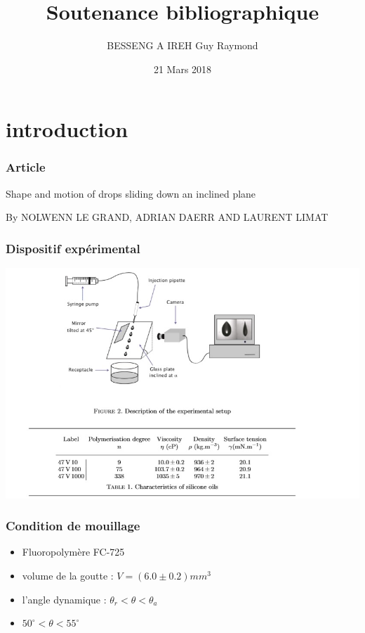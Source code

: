 \documentclass{beamer}
\title{Soutenance bibliographique}
\author{BESSENG A IREH Guy Raymond}
\institute[]{Université Paul Sabatier}
\date{21 Mars 2018}
\begin{document}
\maketitle
\section{introduction}
\begin{frame}
\frametitle{Article}
\begin{center}
Shape and motion of drops sliding down an inclined plane

By NOLWENN LE GRAND, ADRIAN DAERR AND LAURENT LIMAT
\end{center}
\end{frame}

\begin{frame}
\frametitle{Dispositif expérimental}
\includegraphics[scale = 0.5]{Experiment.jpg}
\end{frame}

\begin{frame}
\frametitle{Condition de mouillage}
\begin{itemize}
\item Fluoropolymère FC-725 
\item volume de la goutte : $V = (6.0 \pm 0.2) mm^{3}$
\item l'angle dynamique : $\theta_{r} < \theta < \theta_{a}$
\item $50^{\circ} < \theta < 55^{\circ}$
\end{itemize}
\end{frame}
\end{document}
